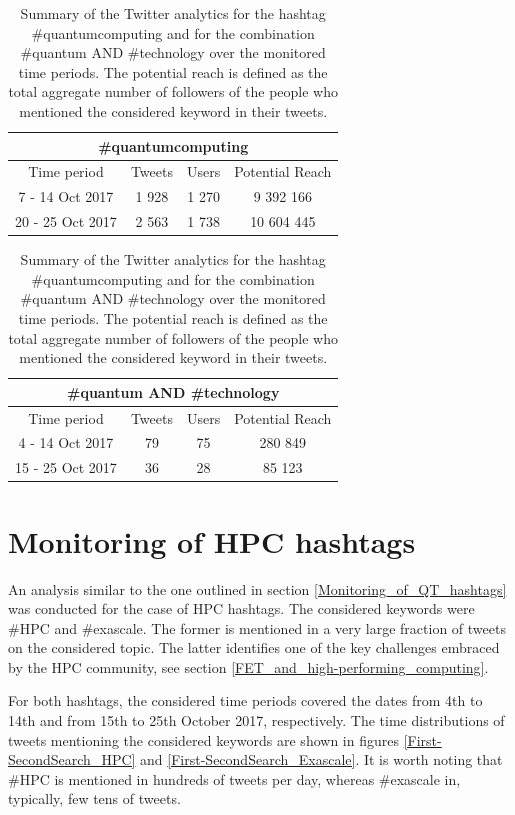 \begin{table}[t]
 \begin{center}
 
  \begin{tabular}{cccc}
   \hline 
   \hline
   \multicolumn{4}{c}{\#quantumcomputing}\\
   \hline
   \hline
   Time period & Tweets & Users & Potential Reach \\ 
   \hline
   7 - 14 Oct 2017 & 1 928 & 1 270 & 9 392 166  \\
   20 - 25 Oct 2017 & 2 563 & 1 738 & 10 604 445  \\
   \hline
   \hline
  \end{tabular}

  \bigskip

  \begin{tabular}{cccc}
   \hline 
   \hline
   \multicolumn{4}{c}{\#quantum AND \#technology}\\
   \hline 
   \hline
   Time period & Tweets & Users & Potential Reach \\ 
   \hline
   4 - 14 Oct 2017 & 79 & 75 & 280 849  \\
   15 - 25 Oct 2017 & 36 & 28 & 85 123  \\
   \hline
   \hline
  \end{tabular}
 \end{center} 
 \caption{Summary of the Twitter analytics for the hashtag \#quantumcomputing and for the combination \#quantum AND \#technology over the monitored time periods. The potential reach is defined as the total aggregate number of followers of the people who mentioned the considered keyword in their tweets.}
\label{Summary_QuantumComputing-Technology} 
\end{table}    

\section{Monitoring of HPC hashtags} \label{Monitoring_of_HPC_hashtags}
An analysis similar to the one outlined in section \ref{Monitoring_of_QT_hashtags} was conducted for the case of HPC hashtags. The considered keywords were \#HPC and \#exascale. The former is mentioned in a very large fraction of tweets on the considered topic. The latter identifies one of the key challenges embraced by the HPC community, see section \ref{FET_and_high-performing_computing}.    

For both hashtags, the considered time periods covered the dates from 4th to 14th and from 15th to 25th October 2017, respectively. The time distributions of tweets mentioning the considered keywords are shown in figures \ref{First-SecondSearch_HPC} and \ref{First-SecondSearch_Exascale}. It is worth noting that \#HPC is mentioned in hundreds of tweets per day, whereas \#exascale in, typically, few tens of tweets. 

